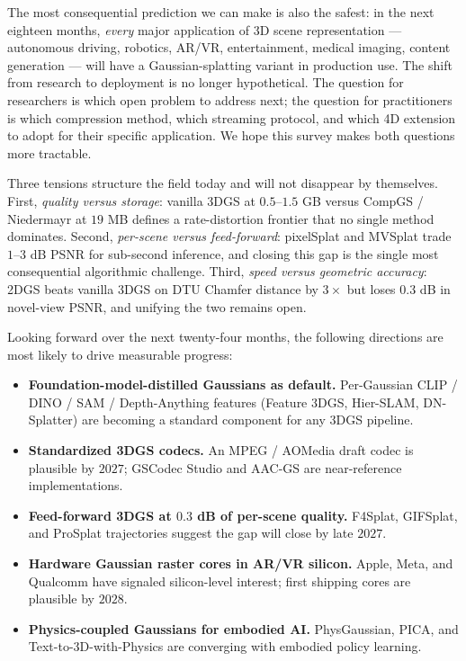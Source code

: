The most consequential prediction we can make is also the safest: in the next eighteen months, \emph{every} major application of 3D scene representation --- autonomous driving, robotics, AR/VR, entertainment, medical imaging, content generation --- will have a Gaussian-splatting variant in production use. The shift from research to deployment is no longer hypothetical. The question for researchers is which open problem to address next; the question for practitioners is which compression method, which streaming protocol, and which 4D extension to adopt for their specific application. We hope this survey makes both questions more tractable.

Three tensions structure the field today and will not disappear by themselves. First, \emph{quality versus storage}: vanilla 3DGS at \(0.5\)--\(1.5\) GB versus CompGS / Niedermayr at \(19\) MB defines a rate-distortion frontier that no single method dominates. Second, \emph{per-scene versus feed-forward}: pixelSplat and MVSplat trade \(1\)--\(3\) dB PSNR for sub-second inference, and closing this gap is the single most consequential algorithmic challenge. Third, \emph{speed versus geometric accuracy}: 2DGS beats vanilla 3DGS on DTU Chamfer distance by \(3{\times}\) but loses \(0.3\) dB in novel-view PSNR, and unifying the two remains open.

Looking forward over the next twenty-four months, the following directions are most likely to drive measurable progress:

\begin{itemize}
\tightlist
\item
  \textbf{Foundation-model-distilled Gaussians as default.} Per-Gaussian CLIP / DINO / SAM / Depth-Anything features (Feature 3DGS, Hier-SLAM, DN-Splatter) are becoming a standard component for any 3DGS pipeline.
\item
  \textbf{Standardized 3DGS codecs.} An MPEG / AOMedia draft codec is plausible by \(2027\); GSCodec Studio and AAC-GS are near-reference implementations.
\item
  \textbf{Feed-forward 3DGS at \(0.3\) dB of per-scene quality.} F4Splat, GIFSplat, and ProSplat trajectories suggest the gap will close by late \(2027\).
\item
  \textbf{Hardware Gaussian raster cores in AR/VR silicon.} Apple, Meta, and Qualcomm have signaled silicon-level interest; first shipping cores are plausible by \(2028\).
\item
  \textbf{Physics-coupled Gaussians for embodied AI.} PhysGaussian, PICA, and Text-to-3D-with-Physics are converging with embodied policy learning.
\end{itemize}

